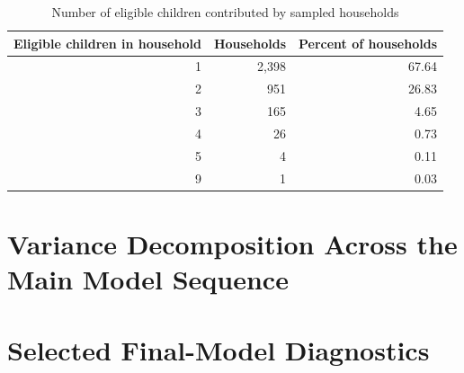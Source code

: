 \begin{table}[H]
\centering
\caption{Number of eligible children contributed by sampled households}
\begin{tabular}{rrr}
\toprule
Eligible children in household & Households & Percent of households \\
\midrule
1 & 2,398 & 67.64 \\
2 & 951 & 26.83 \\
3 & 165 & 4.65 \\
4 & 26 & 0.73 \\
5 & 4 & 0.11 \\
9 & 1 & 0.03 \\
\bottomrule
\end{tabular}
\end{table}

\section{Variance Decomposition Across the Main Model Sequence}

\begin{table}[H]
\centering
\caption{Selected variance summaries across Models 1--3}
\end{table}

\section{Selected Final-Model Diagnostics}

